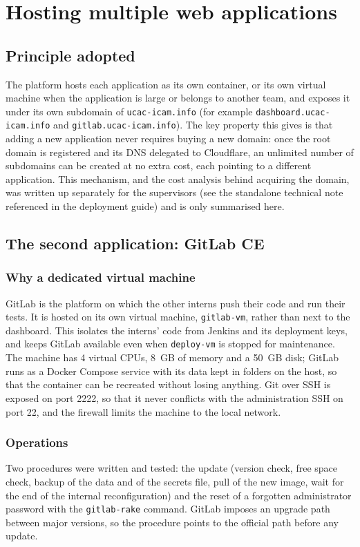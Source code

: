 \chapter{Hosting multiple web applications}
\label{chap:multiapps}

\section{Principle adopted}
The platform hosts each application as its own container, or its own virtual machine when the application is large or belongs to another team, and exposes it under its own subdomain of \texttt{ucac-icam.info} (for example \texttt{dashboard.ucac-icam.info} and \texttt{gitlab.ucac-icam.info}). The key property this gives is that adding a new application never requires buying a new domain: once the root domain is registered and its DNS delegated to Cloudflare, an unlimited number of subdomains can be created at no extra cost, each pointing to a different application. This mechanism, and the cost analysis behind acquiring the domain, was written up separately for the supervisors (see the standalone technical note referenced in the deployment guide) and is only summarised here.

\section{The second application: GitLab CE}
\subsection{Why a dedicated virtual machine}
GitLab is the platform on which the other interns push their code and run their tests. It is hosted on its own virtual machine, \texttt{gitlab-vm}, rather than next to the dashboard. This isolates the interns' code from Jenkins and its deployment keys, and keeps GitLab available even when \texttt{deploy-vm} is stopped for maintenance. The machine has 4 virtual CPUs, 8~GB of memory and a 50~GB disk; GitLab runs as a Docker Compose service with its data kept in folders on the host, so that the container can be recreated without losing anything. Git over SSH is exposed on port 2222, so that it never conflicts with the administration SSH on port 22, and the firewall limits the machine to the local network.

\subsection{Operations}
Two procedures were written and tested: the update (version check, free space check, backup of the data and of the secrets file, pull of the new image, wait for the end of the internal reconfiguration) and the reset of a forgotten administrator password with the \texttt{gitlab-rake} command. GitLab imposes an upgrade path between major versions, so the procedure points to the official path before any update.

